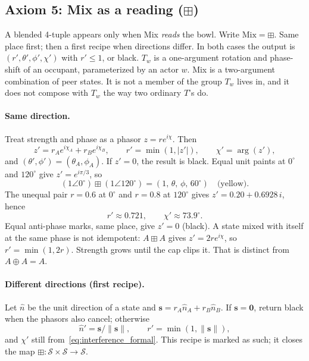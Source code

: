 \documentclass[12pt, a4paper]{article}
\begin{document}
\subsection{Axiom 5: Mix as a reading (\texorpdfstring{$\boxplus$}{boxplus})}
\label{subsec:axiom_interference}
A blended 4-tuple appears only when Mix \emph{reads} the bowl.
Write $\mathrm{Mix}=\boxplus$. Same place first; then a
first recipe when directions differ. In both cases the output is
$(r',\theta',\phi',\chi')$ with $r'\le 1$, or black.
$T_w$ is a one-argument rotation and phase-shift of an occupant,
parameterized by an actor $w$. Mix is a two-argument combination of
peer states. It is not a member of the group $T_w$ lives in, and it
does not compose with $T_w$ the way two ordinary $T$'s do.

\paragraph{Same direction.}
Treat strength and phase as a phasor $z=r e^{i\chi}$. Then
\begin{equation}
    z' = r_A e^{i\chi_A} + r_B e^{i\chi_B},
    \qquad
    r' = \min(1,|z'|),
    \qquad
    \chi' = \arg(z'),
    \label{eq:interference_formal}
\end{equation}
and $(\theta',\phi')=(\theta_A,\phi_A)$. If $z'=0$, the result is
black. Equal unit paints at $0^\circ$ and $120^\circ$ give
$z'=e^{i\pi/3}$, so
\[
(1\angle 0^\circ)\boxplus(1\angle 120^\circ)
=(1,\,\theta,\,\phi,\,60^\circ)
\quad\text{(yellow)}.
\]
The unequal pair $r=0.6$ at $0^\circ$ and $r=0.8$ at $120^\circ$
gives $z'=0.20+0.6928\,i$, hence
\[
r'\approx 0.721,\qquad \chi'\approx 73.9^\circ.
\]
Equal anti-phase marks, same place, give $z'=0$ (black).
A state mixed with itself at the same phase is not idempotent:
$A\boxplus A$ gives $z'=2r e^{i\chi}$, so $r'=\min(1,2r)$.
Strength grows until the cap clips it. That is distinct from
$A\oplus A=A$.

\paragraph{Different directions (first recipe).}
Let $\hat n$ be the unit direction of a state and
$\mathbf{s}=r_A\hat n_A+r_B\hat n_B$. If $\mathbf{s}=\mathbf{0}$,
return black when the phasors also cancel; otherwise
\[
\hat n'=\mathbf{s}/\|\mathbf{s}\|,\qquad
r'=\min(1,\|\mathbf{s}\|),
\]
and $\chi'$ still from~\eqref{eq:interference_formal}.
This recipe is marked as such; it closes the map
$\boxplus:\mathcal{S}\times\mathcal{S}\to\mathcal{S}$.
\end{document}
